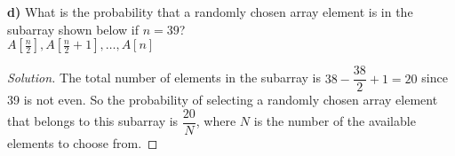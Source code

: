 \documentclass[titlepage, letterpaper, fleqn]{article}
\renewcommand\qedsymbol{\(\blacksquare\)}
\newenvironment{solution}
{\renewcommand\qedsymbol{$\square$}\begin{proof}[Solution]}
{\end{proof}}
\begin{document}
{\large \textbf{d)} What is the probability that a randomly chosen array element is in the subarray shown below if \(n = 39\)?\\
\(A[\frac{n}{2}], A[\frac{n}{2} + 1], \dots , A[n]\)}

\begin{solution}
The total number of elements in the subarray is \(38 - \dfrac{38}{2} + 1 = 20\) since 39 is not even. So the probability of selecting a randomly chosen array element that belongs to this subarray is \(\dfrac{20}{N}\), where \(N\) is the number of the available elements to choose from.
\end{solution}
\end{document}
